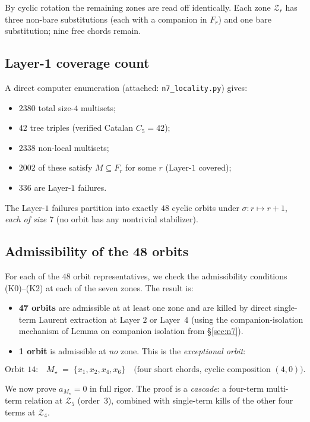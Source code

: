 \documentclass[11pt]{article}
\newcommand{\Zr}{\mathcal{Z}}
\newcommand{\Fr}{F}
\begin{document}
By cyclic rotation the remaining zones are read off identically. Each
zone $\Zr_r$ has three non-bare substitutions (each with a companion in
$\Fr_r$) and one bare substitution; nine free chords remain.

\subsection{Layer-1 coverage count}

A direct computer enumeration (attached: \texttt{n7\_locality.py})
gives:
\begin{itemize}\setlength\itemsep{0pt}
\item $2380$ total size-$4$ multisets;
\item $42$ tree triples (verified Catalan $C_5 = 42$);
\item $2338$ non-local multisets;
\item $2002$ of these satisfy $M \subseteq \Fr_r$ for some $r$
  (Layer-$1$ covered);
\item $336$ are Layer-$1$ failures.
\end{itemize}
The Layer-$1$ failures partition into exactly $48$ cyclic orbits under
$\sigma: r \mapsto r+1$, \emph{each of size $7$} (no orbit has any
nontrivial stabilizer).

\subsection{Admissibility of the 48 orbits}

For each of the $48$ orbit representatives, we check the admissibility
conditions (K0)--(K2) at each of the seven zones. The result is:
\begin{itemize}\setlength\itemsep{0pt}
\item \textbf{47 orbits} are admissible at at least one zone and are
  killed by direct single-term Laurent extraction at Layer $2$ or
  Layer~$4$ (using the companion-isolation mechanism of
  Lemma on companion isolation from \S\ref{sec:n7}).
\item \textbf{1 orbit} is admissible at \emph{no} zone. This is the
  \emph{exceptional orbit}:
\end{itemize}
\[
\text{Orbit 14:}\quad M_\star \;=\; \{x_1, x_2, x_4, x_6\}
\quad \text{(four short chords, cyclic composition $(4, 0)$).}
\]

We now prove $a_{M_\star} = 0$ in full rigor. The proof is a
\emph{cascade}: a four-term multi-term relation at $\Zr_5$ (order~$3$),
combined with single-term kills of the other four terms at $\Zr_4$.
\end{document}
